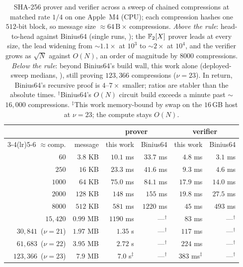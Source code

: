 \begin{table}[t]
\centering\small
\renewcommand{\arraystretch}{1.2}
\begin{tabular}{r r rr rr}
\toprule
 & & \multicolumn{2}{c}{prover} & \multicolumn{2}{c}{verifier} \\
\cmidrule(lr){3-4}\cmidrule(lr){5-6}
$\approx$comp. & message & this work & Binius64 & this work & Binius64 \\
\midrule
$60$         & $3.8$ KB  & $10.1$ ms          & $33.7$ ms     & $4.8$ ms            & $3.1$ ms \\
$250$        & $16$ KB   & $23.3$ ms          & $41.6$ ms     & $9.3$ ms            & $4.6$ ms \\
$1000$       & $64$ KB   & $75.0$ ms          & $84.1$ ms     & $17.9$ ms           & $14.0$ ms \\
$2000$       & $128$ KB  & $148$ ms           & $155$ ms      & $19.8$ ms           & $27.5$ ms \\
$8000$       & $512$ KB  & $581$ ms           & $1220$ ms     & $45$ ms             & $493$ ms \\
$15{,}420$   & $0.99$ MB & $1190$ ms          & ---$^\dagger$ & $83$ ms             & ---$^\dagger$ \\
\midrule
$30{,}841$ \,($\nu{=}21$)  & $1.97$ MB & $1.35$ s           & ---$^\dagger$ & $117$ ms            & ---$^\dagger$ \\
$61{,}683$ \,($\nu{=}22$)  & $3.95$ MB & $2.72$ s           & ---$^\dagger$ & $224$ ms            & ---$^\dagger$ \\
$123{,}366$ \,($\nu{=}23$) & $7.9$ MB  & $7.0$ s$^\ddagger$ & ---$^\dagger$ & $383$ ms$^\ddagger$ & ---$^\dagger$ \\
\bottomrule
\end{tabular}
\caption{SHA-256 prover and verifier across a sweep of chained compressions at
matched rate $1/4$ on one Apple~M4 (CPU); each compression hashes one
$512$-bit block, so message size $\approx 64\,\text{B}\times$\,compressions.
\emph{Above the rule}: head-to-head
against Binius64 (single runs, ); the $\mathbb{F}_2[X]$ prover leads
at every size, the lead widening from $\sim$$1.1\times$ at $10^3$ to
$\sim$$2\times$ at $10^4$, and the verifier grows as $\sqrt N$ against $O(N)$,
an order of magnitude by $8000$ compressions. \emph{Below the rule}: beyond
Binius64's build wall, this work alone (deployed-sweep medians,
), still proving $123{,}366$ compressions ($\nu = 23$).
In return, Binius64's recursive proof is $4$--$7\times$ smaller; ratios are
stabler than the absolute times. $^\dagger$Binius64's $O(N)$ circuit build
exceeds a minute past $\sim$$16{,}000$ compressions. $^\ddagger$This work
memory-bound by swap on the $16$\,GB host at $\nu = 23$; the compute stays
$O(N)$.}
\label{tab:intro-sweep}
\end{table}

